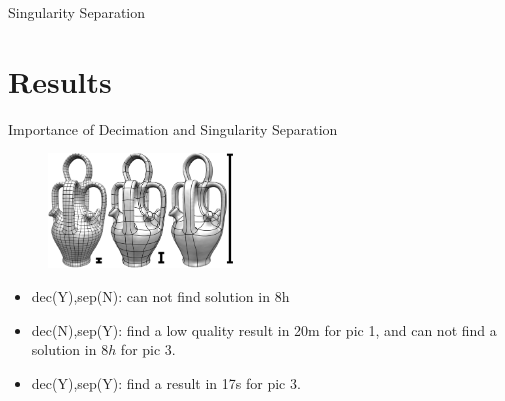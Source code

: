 \documentclass{beamer}
\begin{document}
\begin{frame}{Singularity Separation}
\end{frame}


\section{Results}
\begin{frame}{Importance of Decimation and Singularity Separation}
\begin{figure}
\centering
\includegraphics[height=1.2in]{./img/result0.png}
\end{figure}
\begin{itemize}
\item dec(Y),sep(N): can not find solution in 8h
\item dec(N),sep(Y): find a low quality result in 20m for pic 1, and can not find a solution in $8h$ for pic 3.
\item dec(Y),sep(Y): find a result in 17s for pic 3.
\end{itemize}
\end{frame}
\end{document}
